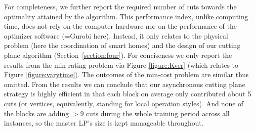 \documentclass[journal]{IEEEtran}
\begin{document}
\par
For completeness, we further report the required number of cuts towards the optimality attained by the algorithm.
This performance index, unlike computing time, does not rely on the computer hardware nor on the
performance of the optimizer software (=Gurobi here).
Instead, it only relates to the physical problem (here the coordination of smart homes) and
the design of our cutting plane algorithm (Section~\ref{section:four}).
For conciseness we only report the results from the min-rating problem via Figure \ref{figure:Kver} (which relates
to Figure \ref{figure:varytime}). The outcomes of the min-cost problem are similar thus omitted.
From the results we can conclude that our asynchronous cutting plane strategy is highly efficient in that
each block on average only contributed about 5 cuts (or vertices, equivalently, standing for
local operation styles).
And none of the blocks are adding $>9$ cuts during the whole training period across all instances,
so the master LP's size is kept manageable throughout.
\end{document}
